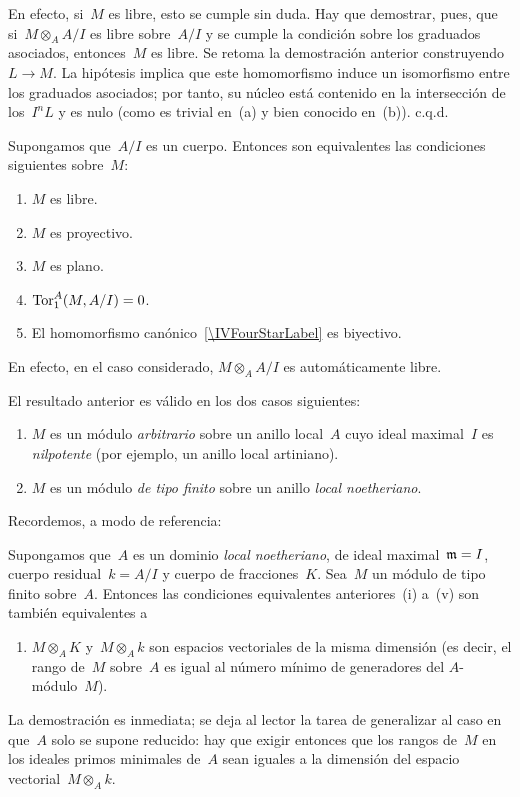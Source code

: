 En efecto, si~$M$ es libre, esto se cumple sin duda. Hay que demostrar,
pues, que si~$M\otimes_A A/I$ es libre sobre~$A/I$ y se cumple la condición
sobre los graduados asociados, entonces~$M$ es libre. Se retoma la
demostración anterior construyendo~$L\to M$. La hipótesis implica que este
homomorfismo induce un isomorfismo entre los graduados asociados; por
tanto, su núcleo está contenido en la intersección de los~$I^nL$ y es nulo
(como es trivial en~(a) y bien conocido en~(b)). c.q.d.


\begin{corollaire}
\label{IV.4.3}
Supongamos que~$A/I$ es un cuerpo. Entonces son equivalentes las condiciones
siguientes sobre~$M$:
\begin{enumerate}
\item[(i)] $M$ es libre.
\item[(ii)] $M$ es proyectivo.
\item[(iii)] $M$ es plano.
\item[(iv)] $\operatorname{Tor}_1^A(M,A/I)=0$.
\item[(v)] El homomorfismo canónico~\eqref{\IVFourStarLabel}
es biyectivo.
\end{enumerate}
\end{corollaire}

En efecto, en el caso considerado, $M\otimes_A A/I$ es automáticamente
libre.

El resultado anterior es válido en los dos casos siguientes:
\begin{enumerate}
\item[(a)] $M$ es un módulo \emph{arbitrario} sobre un anillo local~$A$
cuyo ideal maximal~$I$ es \emph{nilpotente} (por ejemplo, un anillo local
artiniano).
\item[(b)] $M$ es un módulo \emph{de tipo finito} sobre un anillo
\emph{local noetheriano}.
\end{enumerate}

Recordemos, a modo de referencia:
\begin{corollaire}
\label{IV.4.4}
Supongamos que~$A$ es un dominio \emph{local noetheriano}, de ideal
maximal~$\mathfrak{m}=I$, cuerpo residual~$k=A/I$ y cuerpo de
fracciones~$K$. Sea~$M$ un módulo de tipo finito sobre~$A$. Entonces las
condiciones equivalentes anteriores~\textup{(i)} a~\textup{(v)} son
también equivalentes a
{\enlargethispage{.5cm}}%
\begin{enumerate}
\item[(vi)] $M\otimes_A K$ y~$M\otimes_A k$ son espacios vectoriales de
la misma dimensión (es decir, el rango de~$M$ sobre~$A$ es igual al número
mínimo de generadores del $A$-módulo~$M$).
\end{enumerate}
\end{corollaire}

La demostración es inmediata; se deja al lector la tarea de generalizar al
caso en que~$A$ solo se supone reducido: hay que exigir entonces que los
rangos de~$M$ en los ideales primos minimales de~$A$ sean iguales a la
dimensión del espacio vectorial~$M\otimes_A k$.
